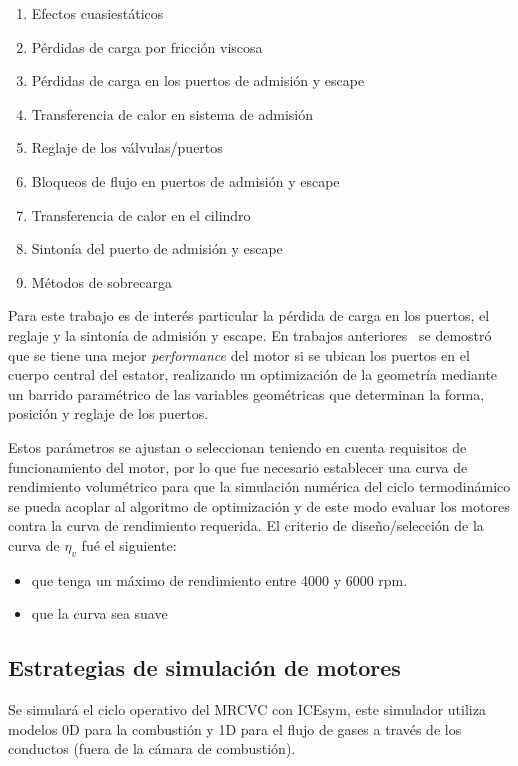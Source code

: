 \begin{enumerate}
    \item Efectos cuasiestáticos
    \item Pérdidas de carga por fricción viscosa
    \item Pérdidas de carga en los puertos de admisión y escape
    \item Transferencia de calor en sistema de admisión
    \item Reglaje de los válvulas/puertos
    \item Bloqueos de flujo en puertos de admisión y escape
    \item Transferencia de calor en el cilindro
    \item Sintonía del puerto de admisión y escape
    \item Métodos de sobrecarga 
\end{enumerate}

Para este trabajo es de interés particular la pérdida de carga en los puertos,
el reglaje y la sintonía de admisión y escape.
%
En trabajos anteriores~\cite{lopez13} se demostró que se tiene una mejor
\emph{performance} del motor si se ubican los puertos en el cuerpo central del
estator, realizando un optimización de la geometría mediante un barrido
paramétrico de las variables geométricas que determinan la forma, posición y
reglaje de los puertos.
%

Estos parámetros se ajustan o seleccionan teniendo en cuenta requisitos de
funcionamiento del motor, por lo que fue necesario establecer una curva de
rendimiento volumétrico para que la simulación numérica del
ciclo termodinámico se pueda acoplar al algoritmo de optimización y de este
modo evaluar los motores contra la curva de rendimiento requerida.
%
El criterio de diseño/selección de la curva de $\eta_v$ fué el siguiente:

\begin{itemize}
  \item que tenga un máximo de rendimiento entre 4000 y 6000 rpm.
  \item que la curva sea suave
\end{itemize}

\subsection{Estrategias de simulación de motores}
%
Se simulará el ciclo operativo del MRCVC con ICEsym, este simulador utiliza
modelos 0D para la combustión y 1D para el flujo de gases a través de los
conductos (fuera de la cámara de combustión).

